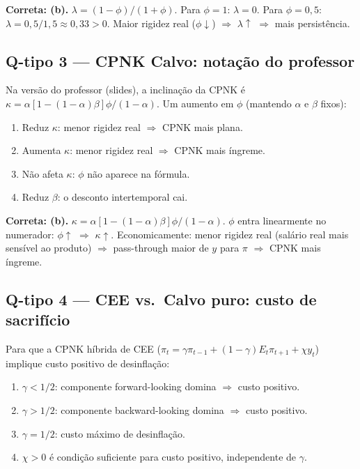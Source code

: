 \documentclass[12pt, a4paper]{article}
\begin{document}
\begin{resultbox}[title={Gabarito: (b)}]
\textbf{Correta: (b).} $\lambda = (1-\phi)/(1+\phi)$. Para $\phi=1$: $\lambda=0$. Para $\phi=0{,}5$: $\lambda = 0{,}5/1{,}5 \approx 0{,}33 > 0$. Maior rigidez real ($\phi\downarrow$) $\Rightarrow$ $\lambda\uparrow$ $\Rightarrow$ mais persistência.
\end{resultbox}

\subsection*{Q-tipo 3 --- CPNK Calvo: notação do professor}

Na versão do professor (slides), a inclinação da CPNK é $\kappa = \alpha[1-(1-\alpha)\beta]\phi/(1-\alpha)$. Um aumento em $\phi$ (mantendo $\alpha$ e $\beta$ fixos):

\begin{enumerate}[label=(\alph*)]
  \item Reduz $\kappa$: menor rigidez real $\Rightarrow$ CPNK mais plana.
  \item Aumenta $\kappa$: menor rigidez real $\Rightarrow$ CPNK mais íngreme.
  \item Não afeta $\kappa$: $\phi$ não aparece na fórmula.
  \item Reduz $\beta$: o desconto intertemporal cai.
\end{enumerate}

\begin{resultbox}[title={Gabarito: (b)}]
\textbf{Correta: (b).} $\kappa = \alpha[1-(1-\alpha)\beta]\phi/(1-\alpha)$. $\phi$ entra linearmente no numerador: $\phi\uparrow$ $\Rightarrow$ $\kappa\uparrow$. Economicamente: menor rigidez real (salário real mais sensível ao produto) $\Rightarrow$ pass-through maior de $y$ para $\pi$ $\Rightarrow$ CPNK mais íngreme.
\end{resultbox}

\subsection*{Q-tipo 4 --- CEE vs.\ Calvo puro: custo de sacrifício}

Para que a CPNK híbrida de CEE ($\pi_t = \gamma\pi_{t-1} + (1-\gamma)E_t\pi_{t+1} + \chi y_t$) implique custo positivo de desinflação:

\begin{enumerate}[label=(\alph*)]
  \item $\gamma < 1/2$: componente forward-looking domina $\Rightarrow$ custo positivo.
  \item $\gamma > 1/2$: componente backward-looking domina $\Rightarrow$ custo positivo.
  \item $\gamma = 1/2$: custo máximo de desinflação.
  \item $\chi > 0$ é condição suficiente para custo positivo, independente de $\gamma$.
\end{enumerate}
\end{document}
